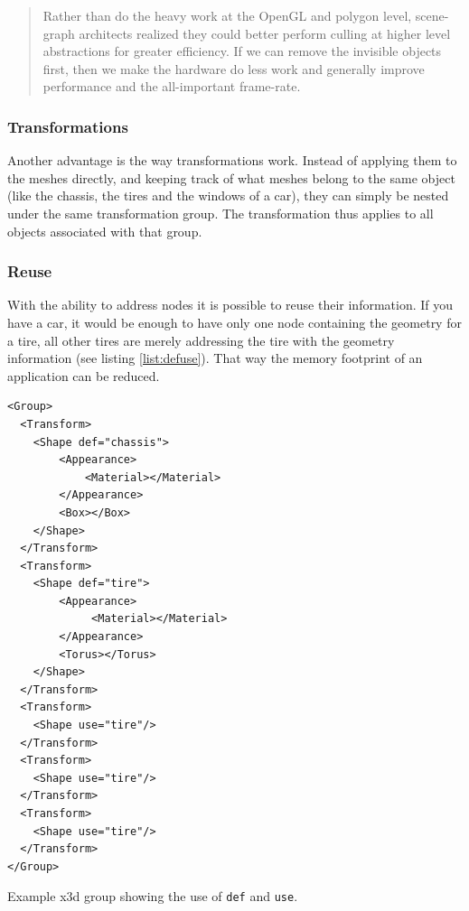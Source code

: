 \begin{quote}
  Rather than do the heavy work at the OpenGL and polygon level,
  scene-graph architects realized they could better perform culling at
  higher level abstractions for greater efficiency. If we can remove the
  invisible objects first, then we make the hardware do less work and
  generally improve performance and the all-important frame-rate. \cite{realityprime}
\end{quote}

\subsubsection{Transformations}\label{transformations}

Another advantage is the way transformations work. Instead of applying
them to the meshes directly, and keeping track of what meshes belong to
the same object (like the chassis, the tires and the windows of a
car), they can simply be nested under the same transformation group. The
transformation thus applies to all objects associated with that group.

\subsubsection{Reuse}\label{reuse}

With the ability to address nodes it is possible to reuse their
information. If you have a car, it would be enough to have only one node
containing the geometry for a tire, all other tires are merely addressing
the tire with the geometry information (see listing \ref{list:defuse}).
That way the memory footprint of an application can be reduced.

\begin{listing}
  \begin{verbatim}
<Group>
  <Transform>
    <Shape def="chassis">
        <Appearance>
            <Material></Material>
        </Appearance>
        <Box></Box>
    </Shape>
  </Transform>
  <Transform>
    <Shape def="tire">
        <Appearance>
             <Material></Material>
        </Appearance>
        <Torus></Torus>
    </Shape>
  </Transform>
  <Transform>
    <Shape use="tire"/>
  </Transform>
  <Transform>
    <Shape use="tire"/>
  </Transform>
  <Transform>
    <Shape use="tire"/>
  </Transform>
</Group>
  \end{verbatim}
  \caption{Example x3d group showing the use of \texttt{def} and \texttt{use}.}
  \label{list:defuse}
\end{listing}


